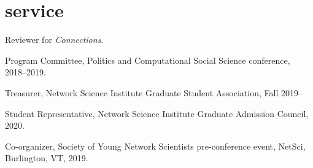 \documentclass[11pt, letter]{article}
\begin{document}
 \section{service}
 Reviewer for \textit{Connections}.

 Program Committee, Politics and Computational Social Science conference, 2018--2019.

 Treasurer, Network Science Institute Graduate Student Association, Fall 2019--

 Student Representative, Network Science Institute Graduate Admission Council, 2020.

 Co-organizer, Society of Young Network Scientists pre-conference event, NetSci, Burlington, VT, 2019.


\end{document}
